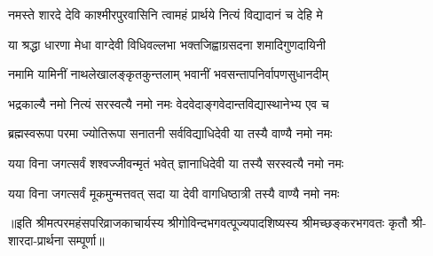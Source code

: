 

\twolineshloka
{नमस्ते शारदे देवि काश्मीरपुरवासिनि}
{त्वामहं प्रार्थये नित्यं विद्यादानं च देहि मे}

\twolineshloka
{या श्रद्धा धारणा मेधा वाग्देवी विधिवल्लभा}
{भक्तजिह्वाग्रसदना शमादिगुणदायिनी}

\twolineshloka
{नमामि यामिनीं नाथलेखालङ्कृतकुन्तलाम्}
{भवानीं भवसन्तापनिर्वापणसुधानदीम्}

\twolineshloka
{भद्रकाल्यै नमो नित्यं सरस्वत्यै नमो नमः}
{वेदवेदाङ्गवेदान्तविद्यास्थानेभ्य एव च}

\twolineshloka
{ब्रह्मस्वरूपा परमा ज्योतिरूपा सनातनी}
{सर्वविद्याधिदेवी या तस्यै वाण्यै नमो नमः}

\twolineshloka
{यया विना जगत्सर्वं शश्वज्जीवन्मृतं भवेत्}
{ज्ञानाधिदेवी या तस्यै सरस्वत्यै नमो नमः}

\twolineshloka
{यया विना जगत्सर्वं मूकमुन्मत्तवत् सदा}
{या देवी वागधिष्ठात्री तस्यै वाण्यै नमो नमः}

॥इति  श्रीमत्परमहंसपरिव्राजकाचार्यस्य श्रीगोविन्दभगवत्पूज्यपादशिष्यस्य 
श्रीमच्छङ्करभगवतः कृतौ श्री-शारदा-प्रार्थना सम्पूर्णा॥
